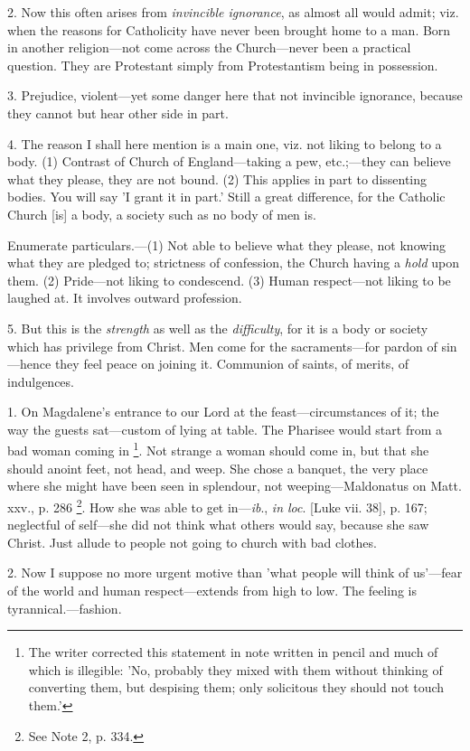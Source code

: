 2. Now this often arises from \emph{invincible
ignorance}, as almost all would admit; viz. when the reasons for
Catholicity have never been brought home to a man. Born in another
religion—not come across the Church—never been a practical
question. They are Protestant simply from Protestantism being in
possession.

3. Prejudice, violent—yet some danger here that
not invincible ignorance, because they cannot but hear other side in
part.

4. The reason I shall here mention is a main one,
viz. not liking to belong to a body. (1) Contrast of Church of
England—taking a pew, etc.;—they can believe what they please,
they are not bound. (2) This applies in part to dissenting bodies. You
will say 'I grant it in part.' Still a great difference, for the
Catholic Church [is] a body, a society such as no body of men is.

Enumerate particulars.—(1) Not able to believe
what they please, not knowing what they are pledged to; strictness of
confession, the Church having a \emph{hold} upon them. (2) Pride—not
liking to condescend. (3) Human respect—not liking to be laughed
at. It involves outward profession.

5. But this is the \emph{strength} as well as the
\emph{difficulty}, for it is a body or society which has privilege
from Christ. Men come for the sacraments—for pardon of sin—hence
they feel peace on joining it. Communion of saints, of merits, of
indulgences.


1. On Magdalene's entrance to our Lord at the
feast—circumstances of it; the way the guests sat—custom of lying
at table. The Pharisee would start from a bad woman coming in \footnote{The writer corrected this
statement in note written in pencil and much of which is illegible:
'No, probably they mixed with them without thinking of converting
them, but despising them; only solicitous they should not touch them.'}. Not strange a woman should come in, but that she should anoint
feet, not head, and weep. She chose a banquet, the very place where
she might have been seen in splendour, not weeping—Maldonatus on
Matt. xxv., p. 286 \footnote{See Note
2, p. 334.}. How
she was able to get in—\emph{ib}., \emph{in loc}. [Luke vii. 38], p.
167; neglectful of self—she did not think what others would say,
because she saw Christ. Just allude to people not going to church with
bad clothes.

2. Now I suppose no more urgent motive than 'what
people will think of us'—fear of the world and human
respect—extends from high to low. The feeling is
tyrannical.—fashion.

